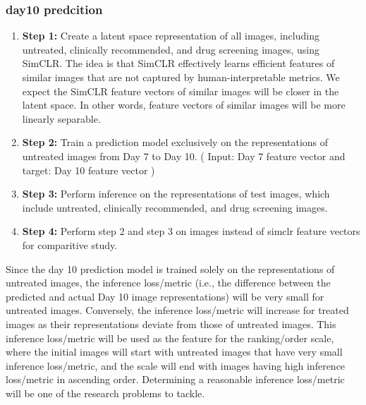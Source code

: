\subsubsection{day10 predcition}
\begin{enumerate}
    \item \textbf{Step 1:} Create a latent space representation of all images, including untreated, clinically recommended, 
    and drug screening images, using SimCLR. 
    The idea is that SimCLR effectively learns efficient features of similar images that are not captured by 
    human-interpretable metrics. We expect the SimCLR feature vectors of similar images will be closer in the latent space. 
    In other words, feature vectors of similar images will be more linearly separable.
  
  \item \textbf{Step 2:} Train a prediction model exclusively on the representations of 
  untreated images from Day 7 to Day 10. ( Input: Day 7 feature vector and target: Day 10 feature vector )

  
  \item \textbf{Step 3:} Perform inference on the representations of test images, which include untreated, clinically recommended, and drug screening images.
  \item \textbf{Step 4:} Perform step 2 and step 3 on images instead of simclr feature vectors for comparitive study.
\end{enumerate}

Since the day 10 prediction model is trained solely on the representations of untreated images, the inference loss/metric 
(i.e., the difference between the predicted and actual Day 10 image representations) will be very small for untreated images.
 Conversely, the inference loss/metric will increase for treated images as their representations deviate from those of untreated images.
This inference loss/metric will be used as the feature for the ranking/order scale, where the initial images will start 
with untreated images that have very small inference loss/metric, and the scale will end with images having high inference loss/metric in ascending order. 
Determining a reasonable inference loss/metric will be one of the research problems to tackle.

